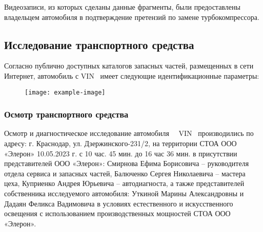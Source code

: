 Видеозаписи, из которых  сделаны данные фрагменты, были предоставлены владельцем автомобиля в подтверждение претензий по замене турбокомпрессора.


\vspace{3mm}

% 
\subsection{Исследование транспортного средства}

Согласно публично доступных  каталогов запасных частей, размещенных в сети Интернет,  автомобиль с VIN \vin \ имеет следующие идентификационные параметры:
\begin{figure}[H]
	\centering
	\texttt{[image: example-image]}
\end{figure}


\subsubsection{Осмотр транспортного средства}

Осмотр и диагностическое исследование  автомобиля  \, \, VIN \vin \, производились по адресу: г. Краснодар, ул. Дзержинского-231/2, на территории СТОА ООО «Элерон» 10.05.2023 г. с 10 час. 45 мин. до 16 час 36 мин.   в присутствии представителей ООО «Элерон»: Смирнова Ефима Борисовича – руководителя отдела сервиса и запасных частей, Балюченко Сергея Николаевича – мастера цеха, Куприенко Андрея Юрьевича – автодиагноста, а также представителей собственника исследуемого автомобиля: Уткиной Марины Александровны и Дадаян Феликса Вадимовича в условиях естественного и искусственного освещения с использованием производственных мощностей СТОА ООО «Элерон».

